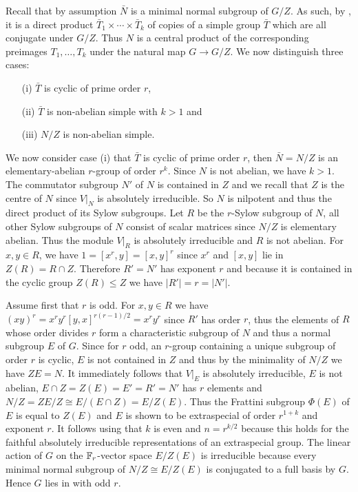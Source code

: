 Recall that by assumption $\bar N$ is a minimal normal subgroup of $G/Z$.
As such, by \cite[Theorem 4.3A.(iii)]{DixonMort}, it is
a direct product $\bar T_1 \times \cdots \times \bar T_k$ of copies of a 
simple group $\bar T$ which are all conjugate under $G/Z$. Thus $N$ is
a central product of the corresponding preimages $T_1, \ldots, T_k$
under the natural map $G \to G/Z$. We now distinguish three cases:
\begin{itemize}\setlength{\itemsep}{0pt}\setlength{\parskip}{0pt}
\item[(i)] $\bar T$ is cyclic of prime order $r$, 
\item[(ii)] $\bar T$ is non-abelian simple with $k > 1$ and
\item[(iii)] $N/Z$ is non-abelian simple.
\end{itemize}
We now consider case (i) that $\bar T$ is cyclic of prime order $r$, then
$\bar N = N/Z$ is an elementary-abelian $r$-group of order $r^k$.
Since $N$ is not abelian, we have $k > 1$.
The commutator subgroup $N'$ of $N$ is contained in $Z$ and
we recall that $Z$ is the centre of $N$ since $V|_N$ is absolutely
irreducible. So $N$ is nilpotent and thus the direct product of its
Sylow subgroups. Let $R$ be the $r$-Sylow subgroup of $N$, all other
Sylow subgroups of $N$ consist of scalar matrices since $N/Z$ is
elementary abelian. Thus the module $V|_R$ is absolutely irreducible
and $R$ is not abelian.
For $x,y \in R$, we have $1 = [x^r,y] = [x,y]^r$ since $x^r$ and 
$[x,y]$ lie in $Z(R) = R \cap Z$. Therefore $R'=N'$ has exponent $r$ and
because it is contained in the cyclic group $Z(R) \le Z$ we have $|R'| =
r = |N'|$.

Assume first that $r$ is odd. For $x,y \in R$ we have $(xy)^r =
x^ry^r[y,x]^{r(r-1)/2} = x^ry^r$ since $R'$ has order $r$, thus the
elements of $R$ whose order divides $r$ form a characteristic 
subgroup of $N$ and thus a normal subgroup $E$ of $G$. Since for
$r$ odd, an $r$-group containing a unique subgroup of order $r$ is
cyclic, $E$ is not contained in $Z$ and thus by the minimality
of $N/Z$ we have $Z E = N$. It immediately follows that $V|_E$
is absolutely irreducible, $E$ is not abelian, 
$E \cap Z = Z(E) = E' = R' = N'$ has $r$ elements and 
$N/Z = ZE/Z \cong E/(E \cap Z) = E/Z(E)$. Thus the Frattini subgroup
$\Phi(E)$ of $E$ is equal to $Z(E)$ and $E$ is shown to be extraspecial
of order $r^{1+k}$ and exponent $r$. It follows using
\cite[V.16.14]{Hup} that $k$ is even and
$n=r^{k/2}$ because this holds for the faithful absolutely irreducible
representations of an extraspecial group. The linear action of $G$ on
the $\mathbb{F}_r$-vector space $E/Z(E)$ is irreducible because every minimal
normal subgroup of $N/Z \cong E/Z(E)$ is conjugated to a full basis by
$G$. Hence $G$ lies in  with odd $r$.


